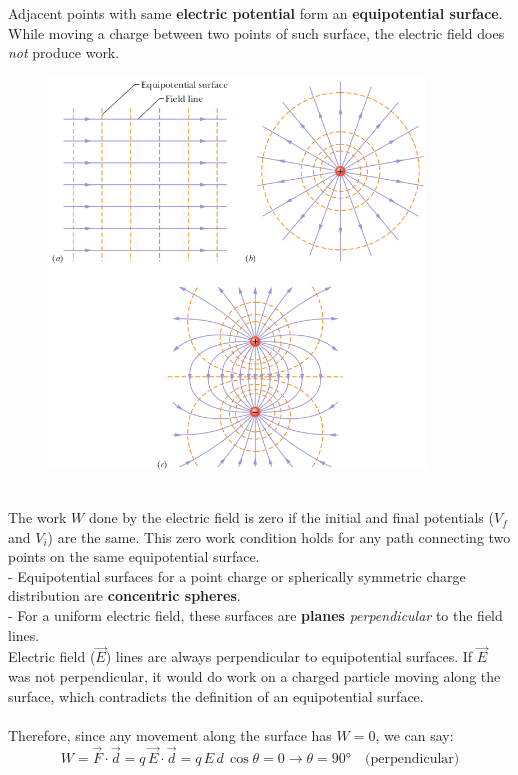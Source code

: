 \documentclass[12pt, a4paper]{article}
\begin{document}
		Adjacent points with same \textbf{electric potential} form an \textbf{equipotential surface}. While moving a charge between two points of such surface, the electric field does \textit{not} produce work.
		\begin{figure}[!htb]
			\centering
			\includegraphics[width=10cm]{Physics2_PNGs/electric-field-lines-surf.png}
			\caption*{}
			\label{fig:electric-field-lines-surf}
		\end{figure} \\
		The work $W$ done by the electric field is zero if the initial and final potentials ($V_f$ and $V_i$) are the same.
		This zero work condition holds for any path connecting two points on the same equipotential surface. \\ 
		- Equipotential surfaces for a point charge or spherically symmetric charge  distribution are \textbf{concentric spheres}. \\
		- For a uniform electric field, these surfaces are \textbf{planes} \textit{perpendicular} to the field lines. \\
		Electric field ($\vec{E}$) lines are always perpendicular to equipotential surfaces. If $\vec{E}$ was not perpendicular, it would do work on a charged particle moving along the surface, which contradicts the definition of an equipotential surface. \\ \\
		Therefore, since any movement along the surface has $W = 0$, we can say:
		\[
			W = \vec{F} \cdot \vec{d} = q \, \vec{E} \cdot \vec{d}
			  = q \, E \, d \, \cos \theta = 0 \rightarrow \theta = 90\text{°} \quad \text{(perpendicular)}
		\]
		
\end{document}
